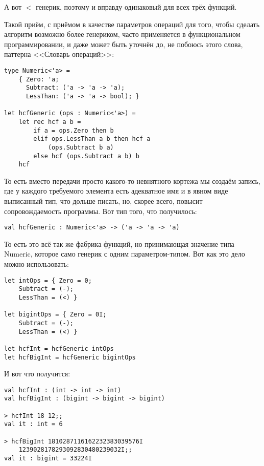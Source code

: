 \documentclass{../../text-style}
\begin{document}
А вот $<$ генерик, поэтому и вправду одинаковый для всех трёх функций.

Такой приём, с приёмом в качестве параметров операций для того, чтобы сделать алгоритм возможно более генериком, часто применяется в функциональном программировании, и даже может быть уточнён до, не побоюсь этого слова, паттерна <<Словарь операций>>:

\begin{verbatim}
type Numeric<'a> =
    { Zero: 'a;
      Subtract: ('a -> 'a -> 'a);
      LessThan: ('a -> 'a -> bool); }

let hcfGeneric (ops : Numeric<'a>) =
    let rec hcf a b =
        if a = ops.Zero then b
        elif ops.LessThan a b then hcf a 
            (ops.Subtract b a)
        else hcf (ops.Subtract a b) b
    hcf
\end{verbatim}

То есть вместо передачи просто какого-то невнятного кортежа мы создаём запись, где у каждого требуемого элемента есть адекватное имя и в явном виде выписанный тип, что дольше писать, но, скорее всего, повысит сопровождаемость программы. Вот тип того, что получилось:

\begin{verbatim}
val hcfGeneric : Numeric<'a> -> ('a -> 'a -> 'a)
\end{verbatim}

То есть это всё так же фабрика функций, но принимающая значение типа Numeric, которое само генерик с одним параметром-типом. Вот как это дело можно использовать:

\begin{verbatim}
let intOps = { Zero = 0; 
    Subtract = (-); 
    LessThan = (<) }
    
let bigintOps = { Zero = 0I; 
    Subtract = (-); 
    LessThan = (<) }

let hcfInt = hcfGeneric intOps
let hcfBigInt = hcfGeneric bigintOps
\end{verbatim}

И вот что получится:

\begin{verbatim}
val hcfInt : (int -> int -> int)
val hcfBigInt : (bigint -> bigint -> bigint)

> hcfInt 18 12;;
val it : int = 6

> hcfBigInt 1810287116162232383039576I 
    1239028178293092830480239032I;;
val it : bigint = 33224I
\end{verbatim}
\end{document}
